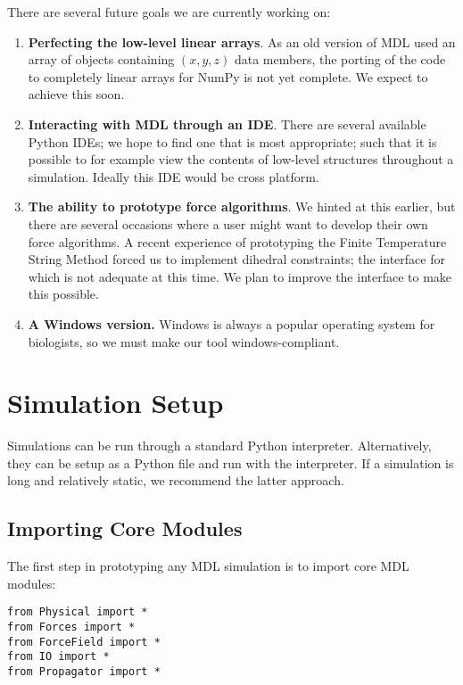 \documentclass[11pt]{report}
\begin{document}
There are several future goals we are currently working on:
\begin{enumerate}
\item {\bf Perfecting the low-level linear arrays}.  As an old
version of MDL used an array of objects containing \begin{math}(x,y,z)\end{math} data members, the porting of the code to completely linear arrays
for NumPy is not yet complete.  We expect to achieve this soon.
\item {\bf Interacting with MDL through an IDE}.  There are several available Python IDEs; we hope to find one that is most appropriate; such that it is possible to for example view the contents of low-level structures throughout a simulation.  Ideally this IDE would be cross platform.
\item {\bf The ability to prototype force algorithms}.  We hinted at this earlier, but there are several occasions where a user might want to develop their own force algorithms.  A recent experience of prototyping the Finite Temperature String Method forced us to implement dihedral constraints; the interface for which is not adequate at this time.  We plan to improve the interface to make this possible.
\item {\bf A Windows version.}  Windows is always a popular operating system for biologists, so we must make our tool windows-compliant.
\end{enumerate}

\chapter{Simulation Setup}

Simulations can be run through a standard Python interpreter.
Alternatively, they can be setup as a Python file and run with
 the interpreter.  If a simulation is long and relatively static,
we recommend the latter approach.

\section{Importing Core Modules}

The first step in prototyping any MDL simulation is to
import core MDL modules:

\begin{verbatim}
from Physical import *
from Forces import *
from ForceField import *
from IO import *
from Propagator import *
\end{verbatim}
\end{document}
